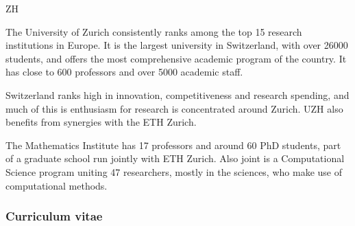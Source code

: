 \begin{sitedescription}{ZH}



The University of Zurich consistently ranks among the top 15 research institutions in Europe. It is the largest university in Switzerland, with over 26000 students, and offers the  most comprehensive academic program of the country.  It has close to 600 professors and over 5000 academic staff. 

Switzerland ranks high in innovation, competitiveness and research spending, and much of this is enthusiasm for research is concentrated around Zurich. UZH also benefits from synergies with the ETH Zurich. 

The Mathematics Institute has 17 professors and around 60 PhD students, part of a graduate school run jointly with ETH Zurich. Also joint is a Computational Science program uniting 47 researchers, mostly in the sciences, who make use of computational methods. 


\subsubsection*{Curriculum vitae}





\end{sitedescription}
